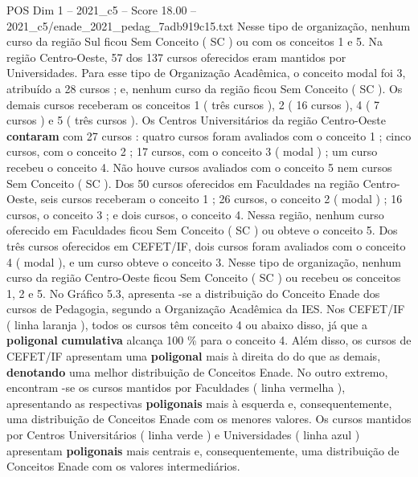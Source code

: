 \begin{textsample}{POS Dim 1 – 2021\_c5 – Score 18.00 – 2021\_c5/enade\_2021\_pedag\_7adb919c15.txt}
Nesse tipo de organização, nenhum curso da região Sul ficou Sem Conceito ( SC ) ou com os conceitos 1 e 5.
Na região Centro-Oeste, 57 dos 137 cursos oferecidos eram mantidos por Universidades.
Para esse tipo de Organização Acadêmica, o conceito modal foi 3, atribuído a 28 cursos ; e, nenhum curso da região ficou Sem Conceito ( SC ).
Os demais cursos receberam os conceitos 1 ( três cursos ), 2 ( 16 cursos ), 4 ( 7 cursos ) e 5 ( três cursos ).
Os Centros Universitários da região Centro-Oeste \textbf{contaram} com 27 cursos : quatro cursos foram avaliados com o conceito 1 ; cinco cursos, com o conceito 2 ; 17 cursos, com o conceito 3 ( modal ) ; um curso recebeu o conceito 4.
Não houve cursos avaliados com o conceito 5 nem cursos Sem Conceito ( SC ).
Dos 50 cursos oferecidos em Faculdades na região Centro-Oeste, seis cursos receberam o conceito 1 ; 26 cursos, o conceito 2 ( modal ) ; 16 cursos, o conceito 3 ; e dois cursos, o conceito 4.
Nessa região, nenhum curso oferecido em Faculdades ficou Sem Conceito ( SC ) ou obteve o conceito 5.
Dos três cursos oferecidos em CEFET/IF, dois cursos foram avaliados com o conceito 4 ( modal ), e um curso obteve o conceito 3.
Nesse tipo de organização, nenhum curso da região Centro-Oeste ficou Sem Conceito ( SC ) ou recebeu os conceitos 1, 2 e 5.
No Gráfico 5.3, apresenta -se a distribuição do Conceito Enade dos cursos de Pedagogia, segundo a Organização Acadêmica da IES.
Nos CEFET/IF ( linha laranja ), todos os cursos têm conceito 4 ou abaixo disso, já que a \textbf{poligonal} \textbf{cumulativa} alcança 100 \% para o conceito 4.
Além disso, os cursos de CEFET/IF apresentam uma \textbf{poligonal} mais à direita do do que as demais, \textbf{denotando} uma melhor distribuição de Conceitos Enade.
No outro extremo, encontram -se os cursos mantidos por Faculdades ( linha vermelha ), apresentando as respectivas \textbf{poligonais} mais à esquerda e, consequentemente, uma distribuição de Conceitos Enade com os menores valores.
Os cursos mantidos por Centros Universitários ( linha verde ) e Universidades ( linha azul ) apresentam \textbf{poligonais} mais centrais e, consequentemente, uma distribuição de Conceitos Enade com os valores intermediários.

\end{textsample}
